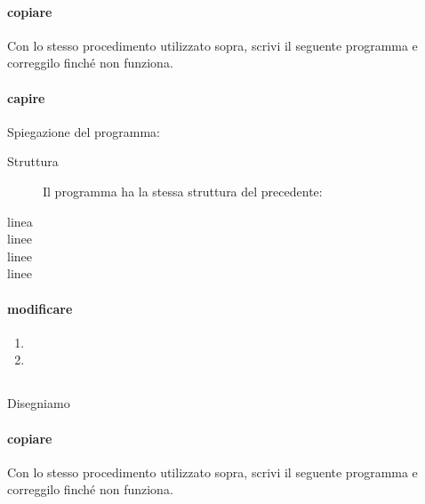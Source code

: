 \paragraph{copiare}
Con lo stesso procedimento utilizzato sopra, scrivi il seguente programma e 
correggilo finché non funziona.



\paragraph{capire}
Spiegazione del programma:

\begin{description}
 \item [Struttura] 
 Il programma ha la stessa struttura del precedente:
 \item [linea ]
 
 \item [linee ]
 
 \item [linee ]
 \item [linee ]
\end{description}

\begin{osservazione}

\end{osservazione}

\paragraph{modificare}
\begin{enumerate} [noitemsep]
 \item 
 \item 
\end{enumerate}


\subsection{}
\label{subsec:geo_int_}
Disegniamo 

\paragraph{copiare}
Con lo stesso procedimento utilizzato sopra, scrivi il seguente programma e 
correggilo finché non funziona.



